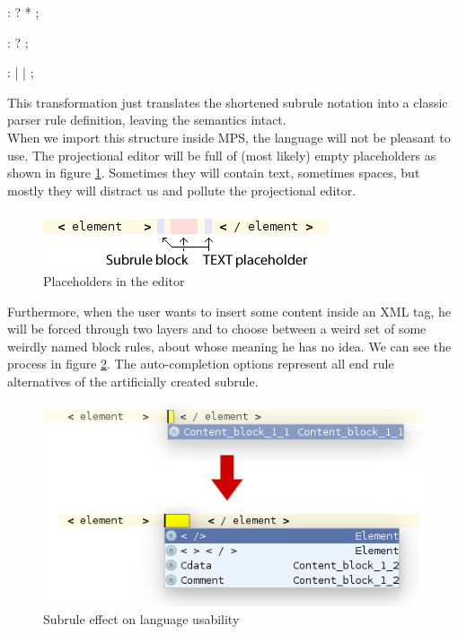\begin{antlr}
	          :   ? * ;

	 :    ?
	                 ;

	 :   
	                 |   
	                 |   
	                 ;
\end{antlr}

This transformation just translates the shortened subrule notation into a classic parser rule definition, leaving the semantics intact.
\\

When we import this structure inside MPS, the language will not be pleasant to use.
The projectional editor will be full of (most likely) empty  placeholders as shown in figure \ref{fig:text_placeholders}.
Sometimes they will contain text, sometimes spaces, but mostly they will distract us and pollute the projectional editor.

\begin{figure}[h]
	\centering
	\includegraphics[scale=0.75]{./img/text_placeholders.png}
	\caption{Placeholders in the editor}
	\label{fig:text_placeholders}
\end{figure}

Furthermore, when the user wants to insert some content inside an XML tag, he will be forced through two layers and to choose between a weird set of some weirdly named block rules, about whose meaning he has no idea.
We can see the process in figure \ref{fig:subrule_problem}.
The auto-completion options represent all end rule alternatives of the artificially created  subrule.
\\

\begin{figure}[h]
	\centering
	\includegraphics[scale=0.75]{./img/subrule_problem.png}
	\caption{Subrule effect on language usability}
	\label{fig:subrule_problem}
\end{figure}

